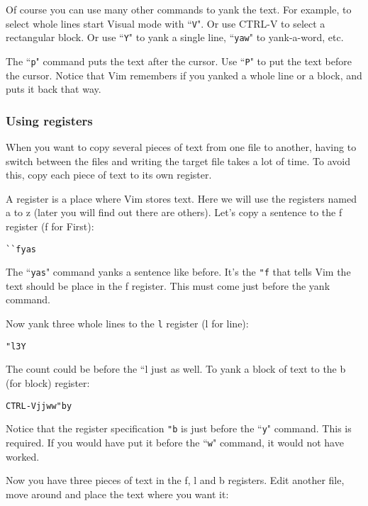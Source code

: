 Of course you can use many other commands to yank the text.
For example, to select whole lines start Visual mode with ``\texttt{V}".
Or use CTRL-V to select a rectangular block.
Or use ``\texttt{Y}" to yank a single line, ``\texttt{yaw}" to yank-a-word, etc.

The ``\texttt{p}" command puts the text after the cursor.
Use ``\texttt{P}" to put the text before the cursor.
Notice that Vim remembers if you yanked a whole line or a block, and puts it back that way.

\subsubsection{Using registers}
When you want to copy several pieces of text from one file to another, having to switch between the files and writing the target file takes a lot of time.
To avoid this, copy each piece of text to its own register.

A register is a place where Vim stores text.
Here we will use the registers named a to z (later you will find out there are others).
Let's copy a sentence to the f register (f for First):

 \begin{Verbatim}[samepage=true]
 ``fyas
 \end{Verbatim}

The ``\texttt{yas}" command yanks a sentence like before.
It's the \texttt{"f} that tells Vim the text should be place in the f register.
This must come just before the yank command.

Now yank three whole lines to the \texttt{l} register (l for line):

 \begin{Verbatim}[samepage=true]
 "l3Y
 \end{Verbatim}

The count could be before the ``l just as well.
To yank a block of text to the b (for block) register:

 \begin{Verbatim}[samepage=true]
 CTRL-Vjjww"by
 \end{Verbatim}

Notice that the register specification \texttt{"b} is just before the ``\texttt{y}" command.
This is required.
If you would have put it before the ``\texttt{w}" command, it would not have worked.

Now you have three pieces of text in the f, l and b registers.
Edit another file, move around and place the text where you want it:


